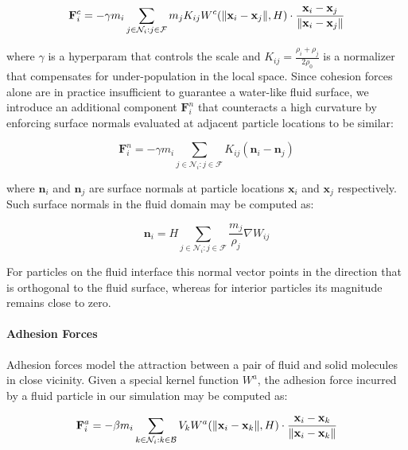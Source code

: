 \documentclass[
	11pt, 
	DIV10,
	ngerman,
	a4paper, 
	oneside, 
	headings=normal, 
	captions=tableheading,
	final, 
	numbers=noenddot
]{scrartcl}
\DeclarePairedDelimiter{\norm}{\lVert}{\rVert}
\begin{document}
\begin{equation}
	\label{eq25}
	\mathbf{F}_{i}^{c} = - \gamma m_{i} \sum_{j \in \mathcal{N}_{i}:j \in \mathcal{F}} m_j K_{ij} W^{c}(\norm{\mathbf{x}_{i} - \mathbf{x}_{j}}, H) \cdot \frac{\mathbf{x}_{i} - \mathbf{x}_{j}}{\norm{\mathbf{x}_{i} - \mathbf{x}_{j}}}
\end{equation}

where $ \gamma $ is a hyperparam that controls the scale and $ K_{ij} = \frac{\rho_{i} + \rho_{j}}{2\rho_{0}} $ is a normalizer that compensates for under-population in the local space. Since cohesion forces alone are in practice insufficient to guarantee a water-like fluid surface, we introduce an additional component $ \mathbf{F}_{i}^{n} $ that counteracts a high curvature by enforcing surface normals evaluated at adjacent particle locations to be similar:

\begin{equation}
	\label{eq26}
	\mathbf{F}_{i}^{n} = - \gamma m_{i} \sum_{j \in \mathcal{N}_{i}:j \in \mathcal{F}} K_{ij} (\mathbf{n}_{i} - \mathbf{n}_{j})
\end{equation}

where $ \mathbf{n}_{i} $ and $ \mathbf{n}_{j} $ are surface normals at particle locations $ \mathbf{x}_{i} $ and $ \mathbf{x}_{j} $ respectively. Such surface normals in the fluid domain may be computed as:

\begin{equation}
	\label{eq27}
	\mathbf{n}_{i} = H \sum_{j \in \mathcal{N}_{i}:j \in \mathcal{F}} \frac{m_{j}}{\rho_{j}} \nabla W_{ij}
\end{equation}

For particles on the fluid interface this normal vector points in the direction that is orthogonal to the fluid surface, whereas for interior particles its magnitude remains close to zero.

\paragraph{Adhesion Forces}

Adhesion forces model the attraction between a pair of fluid and solid molecules in close vicinity. Given a special kernel function $ W^{a} $, the adhesion force incurred by a fluid particle in our simulation may be computed as:

\begin{equation}
	\label{28}
	\mathbf{F}_{i}^{a} = - \beta m_{i} \sum_{k \in \mathcal{N}_{i}:k \in \mathcal{B}} V_{k} W^{a}(\norm{\mathbf{x}_{i} - \mathbf{x}_{k}}, H) \cdot \frac{\mathbf{x}_{i} - \mathbf{x}_{k}}{\norm{\mathbf{x}_{i} - \mathbf{x}_{k}}}
\end{equation}
\end{document}

